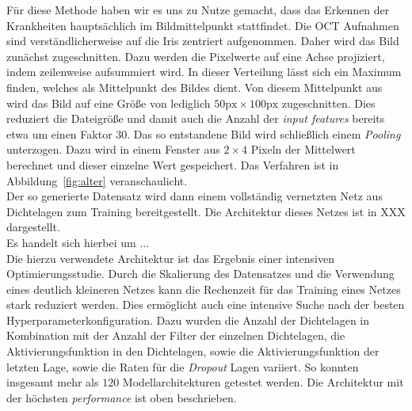 %
Für diese Methode haben wir es uns zu Nutze gemacht, dass das Erkennen der
Krankheiten hauptsächlich im Bildmittelpunkt stattfindet. Die OCT Aufnahmen
sind verständlicherweise auf die Iris zentriert aufgenommen.
Daher wird das Bild zunächst zugeschnitten. Dazu werden die Pixelwerte auf eine
Achse projiziert, indem zeilenweise aufsummiert wird. In dieser Verteilung
lässt sich ein Maximum finden, welches als Mittelpunkt des Bildes dient.
Von diesem Mittelpunkt aus wird das Bild auf eine Größe von lediglich
$50\text{px}\times100\text{px}$ zugeschnitten. Dies reduziert die Dateigröße
und damit auch die Anzahl der \textit{input features} bereits etwa um einen
Faktor $30$.
Das so entstandene Bild wird schließlich einem \textit{Pooling} unterzogen.
Dazu wird in einem Fenster aus $2\times4$ Pixeln der Mittelwert berechnet und
dieser einzelne Wert gespeichert. Das Verfahren ist in
Abbildung~\ref{fig:alter} veranschaulicht. \\
Der so generierte Datensatz wird dann einem vollständig vernetzten Netz aus
Dichtelagen zum Training bereitgestellt. Die Architektur dieses Netzes ist in
XXX dargestellt.\\
Es handelt sich hierbei um ...\\
Die hierzu verwendete Architektur ist das Ergebnis einer intensiven
Optimierungsstudie. Durch die Skalierung des Datensatzes und die Verwendung
eines deutlich kleineren Netzes kann die Rechenzeit für das Training eines
Netzes stark reduziert werden. Dies ermöglicht auch eine intensive Suche nach
der besten Hyperparameterkonfiguration. Dazu wurden die Anzahl der Dichtelagen
in Kombination mit der Anzahl der Filter der einzelnen Dichtelagen, die
Aktivierungsfunktion in den Dichtelagen, sowie die Aktivierungsfunktion der
letzten Lage, sowie die Raten für die \textit{Dropout} Lagen variiert. So
konnten insgesamt mehr als $120$ Modellarchitekturen getestet werden. Die
Architektur mit der höchsten \textit{performance} ist oben beschrieben.
